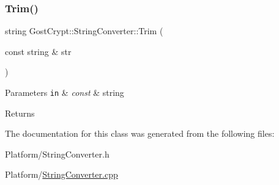 \subsubsection{\texorpdfstring{Trim()}{Trim()}}
{\footnotesize\ttfamily string Gost\+Crypt\+::\+String\+Converter\+::\+Trim (\begin{DoxyParamCaption}\item[{const string \&}]{str }\end{DoxyParamCaption})\hspace{0.3cm}{\ttfamily [static]}}


\begin{DoxyParams}[1]{Parameters}
\mbox{\tt in}  & {\em const} & string \\
\hline
\end{DoxyParams}
\begin{DoxyReturn}{Returns}

\end{DoxyReturn}


The documentation for this class was generated from the following files\+:\begin{DoxyCompactItemize}
\item 
Platform/String\+Converter.\+h\item 
Platform/\hyperlink{_string_converter_8cpp}{String\+Converter.\+cpp}\end{DoxyCompactItemize}
